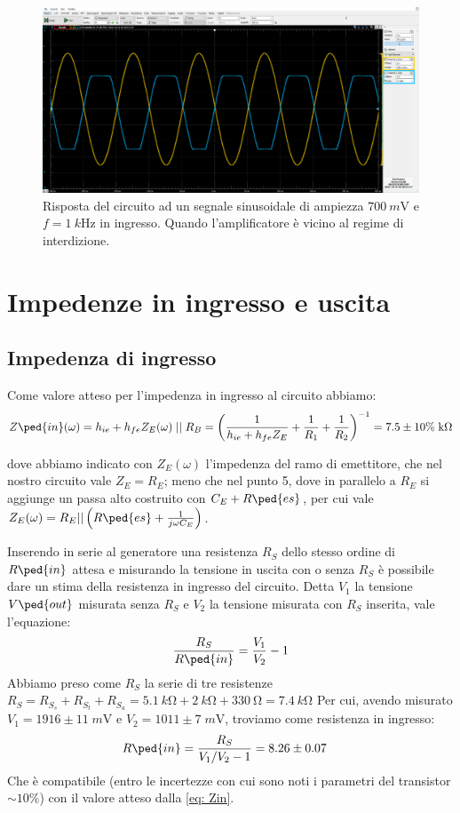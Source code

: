 \documentclass[10pt,a4paper]{article}
\begin{document}
\begin{figure}[htb]
\centering
\includegraphics[scale=0.335]{Aint700mV}
\caption{Risposta del circuito ad un segnale sinusoidale di ampiezza
$\SI{700}{m\V}$ e $f = \SI{1}{k\Hz}$ in ingresso. Quando l'amplificatore
è vicino al regime di interdizione. \label{fig: Aint}}
\end{figure}

\section{Impedenze in ingresso e uscita}
\subsection{Impedenza di ingresso}
Come valore atteso per l'impedenza in ingresso al circuito abbiamo:
\[
Z\ped{in}(\omega) =
h_{ie} + h_{fe}Z_E(\omega) \; \lvert\rvert \; R_B =
\left(\frac{1}{h_{ie} + h_{fe}Z_E} + \frac{1}{R_1} + \frac{1}{R_2}\right)^{-1}
= 7.5 \pm 10\% \; \si{k\ohm} 
\]

dove abbiamo indicato con $Z_E(\omega)$ l'impedenza del ramo di emettitore,
che nel nostro circuito vale $Z_E = R_E$; meno che nel punto 5, dove in
parallelo a $R_E$ si aggiunge un passa alto costruito con $C_E + R\ped{es}$,
per cui vale $Z_E(\omega) = R_E || \left(R\ped{es} + \frac{1}{j \omega C_E}
\right)$.

Inserendo in serie al generatore una resistenza $R_S$ dello stesso ordine di
$R\ped{in}$ attesa e misurando la tensione in uscita con o senza $R_S$ è
possibile dare un stima della resistenza in ingresso del circuito.
Detta $V_1$ la tensione $V\ped{out}$ misurata senza $R_S$ e $V_2$ la tensione
misurata con $R_S$ inserita, vale l'equazione:
\begin{equation}\label{eq: Zin}
\frac{R_S}{R\ped{in}} = \frac{V_1}{V_2} - 1
\end{equation}
Abbiamo preso come $R_S$ la serie di tre resistenze $R_S =
R_{S_s} + R_{S_t} + R_{S_u} =
\SI{5.1}{k\ohm} + \SI{2}{k\ohm} + \SI{330}{\ohm} =
\SI{7.4}{k\ohm}$
Per cui, avendo misurato $V_1 = 1916 \pm 11 \; \si{m\V}$ e
$V_2 = 1011 \pm 7 \; \si{m\V}$, troviamo come resistenza in ingresso:
\begin{align*}
{R\ped{in}} &= \frac{R_S}{V_1/V_2 - 1} = 8.26 \pm 0.07
\end{align*}
Che è compatibile (entro le incertezze con cui sono noti i parametri del
transistor $\sim 10 \%$) con il valore atteso dalla \eqref{eq: Zin}.
\end{document}
